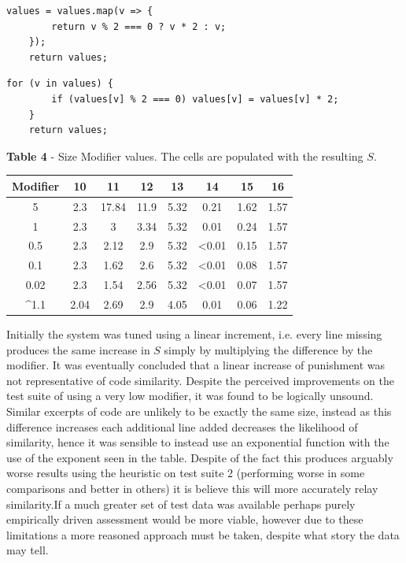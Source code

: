 \documentclass[jou,apacite]{apa6}
\begin{document}
\begin{lstlisting}[caption=Comparison 16a]
values = values.map(v => {
		return v % 2 === 0 ? v * 2 : v;
	});
	return values;
\end{lstlisting}
\begin{lstlisting}[caption=Comparison 16b]
	for (v in values) {
		if (values[v] % 2 === 0) values[v] = values[v] * 2;
	}
	return values;
\end{lstlisting}

\textbf{Table 4} - Size Modifier values. The cells are populated with the resulting $S$.

\renewcommand{\arraystretch}{1.5}

\begin{center}
 \begin{tabular}{||c c c c c c c c ||} 
 \hline
 Modifier & 10 & 11 & 12 & 13 & 14 & 15 & 16 \\ [-0.2ex] 
 \hline\hline
 5   & 2.3 & 17.84 & 11.9 & 5.32 & 0.21 & 1.62 & 1.57  \\ 
 \hline
 1 & 2.3 & 3 & 3.34 & 5.32 & 0.01 & 0.24 & 1.57 \\ 
  \hline
  0.5 & 2.3 & 2.12 & 2.9 & 5.32 & <0.01 & 0.15 & 1.57  \\ 
   \hline
   0.1 & 2.3 & 1.62 & 2.6 & 5.32 & <0.01 & 0.08 & 1.57 \\ 
    \hline
     0.02 & 2.3 & 1.54 & 2.56 & 5.32 & <0.01 & 0.07 & 1.57\\  
     \hline
      \textasciicircum 1.1 & 2.04 & 2.69 & 2.9 & 4.05 & 0.01 & 0.06 & 1.22 \\ 
      \hline
\end{tabular}
\end{center}

Initially the system was tuned using a linear increment, i.e. every line missing produces the same increase in $S$ simply by multiplying the difference by the modifier. It was eventually concluded that a linear increase of punishment was not representative of code similarity. Despite the perceived improvements on the test suite of using a very low modifier, it was found to be logically unsound. Similar excerpts of code are unlikely to be exactly the same size, instead as this difference increases each additional line added decreases the likelihood of similarity, hence it was sensible to instead use an exponential function with the use of the exponent seen in the table.  Despite of the fact this produces arguably worse results using the heuristic on test suite 2 (performing worse in some comparisons and better in others) it is believe this will more accurately relay similarity.If a much greater set of test data was available perhaps purely empirically driven assessment would be more viable, however due to these limitations a more reasoned approach must be taken, despite what story the data may tell. 
\end{document}
